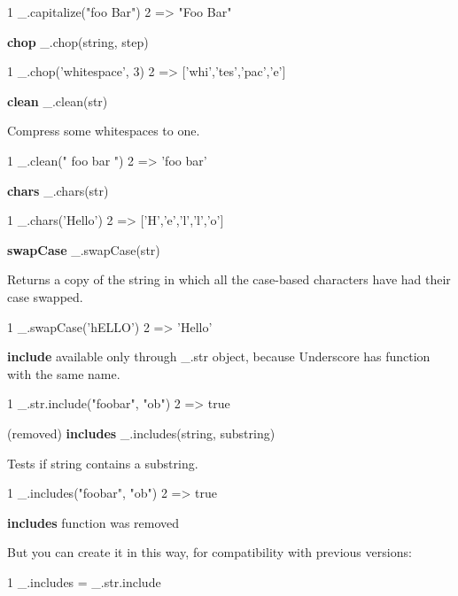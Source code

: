 \begin{DoxyCode}
1 \_.capitalize("foo Bar")
2 => "Foo Bar"
\end{DoxyCode}


{\bfseries chop} \+\_\+.\+chop(string, step)


\begin{DoxyCode}
1 \_.chop('whitespace', 3)
2 => ['whi','tes','pac','e']
\end{DoxyCode}


{\bfseries clean} \+\_\+.\+clean(str)

Compress some whitespaces to one.


\begin{DoxyCode}
1 \_.clean(" foo    bar   ")
2 => 'foo bar'
\end{DoxyCode}


{\bfseries chars} \+\_\+.\+chars(str)


\begin{DoxyCode}
1 \_.chars('Hello')
2 => ['H','e','l','l','o']
\end{DoxyCode}


{\bfseries swap\+Case} \+\_\+.\+swap\+Case(str)

Returns a copy of the string in which all the case-\/based characters have had their case swapped.


\begin{DoxyCode}
1 \_.swapCase('hELLO')
2 => 'Hello'
\end{DoxyCode}


{\bfseries include} available only through \+\_\+.\+str object, because Underscore has function with the same name.


\begin{DoxyCode}
1 \_.str.include("foobar", "ob")
2 => true
\end{DoxyCode}


(removed) {\bfseries includes} \+\_\+.\+includes(string, substring)

Tests if string contains a substring.


\begin{DoxyCode}
1 \_.includes("foobar", "ob")
2 => true
\end{DoxyCode}


{\bfseries includes} function was removed

But you can create it in this way, for compatibility with previous versions\+:


\begin{DoxyCode}
1 \_.includes = \_.str.include
\end{DoxyCode}



